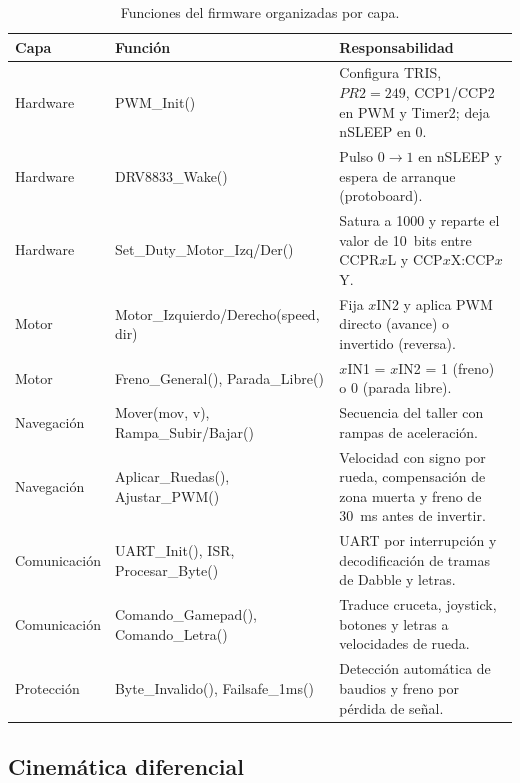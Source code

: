 \begin{table}[H]
  \centering
  \caption{Funciones del firmware organizadas por capa.}
  \label{tab:funciones}
  \small
  \begin{tabularx}{\textwidth}{@{}l >{\ttfamily\raggedright\arraybackslash}p{4.6cm} L@{}}
    \toprule
    \textbf{Capa} & \textbf{\normalfont Función} & \textbf{Responsabilidad} \\
    \midrule
    Hardware     & PWM\_Init()                       & Configura TRIS, $PR2 = 249$, CCP1/CCP2 en PWM y Timer2; deja nSLEEP en 0. \\
    Hardware     & DRV8833\_Wake()                   & Pulso $0 \rightarrow 1$ en nSLEEP y espera de arranque (protoboard). \\
    Hardware     & Set\_Duty\_Motor\_Izq/\allowbreak Der() & Satura a 1000 y reparte el valor de 10~bits entre CCPR$x$L y CCP$x$X:CCP$x$Y. \\
    Motor        & Motor\_Izquierdo/\allowbreak Derecho(speed, dir) & Fija $x$IN2 y aplica PWM directo (avance) o invertido (reversa). \\
    Motor        & Freno\_General(), Parada\_Libre() & $x$IN1 = $x$IN2 = 1 (freno) o 0 (parada libre). \\
    Navegación   & Mover(mov, v), Rampa\_Subir/\allowbreak Bajar() & Secuencia del taller con rampas de aceleración. \\
    Navegación   & Aplicar\_Ruedas(), Ajustar\_PWM() & Velocidad con signo por rueda, compensación de zona muerta y freno de \SI{30}{\milli\second} antes de invertir. \\
    Comunicación & UART\_Init(), ISR, Procesar\_Byte() & UART por interrupción y decodificación de tramas de Dabble y letras. \\
    Comunicación & Comando\_Gamepad(), Comando\_Letra() & Traduce cruceta, joystick, botones y letras a velocidades de rueda. \\
    Protección   & Byte\_Invalido(), Failsafe\_1ms() & Detección automática de baudios y freno por pérdida de señal. \\
    \bottomrule
  \end{tabularx}
\end{table}

\subsection{Cinemática diferencial}

